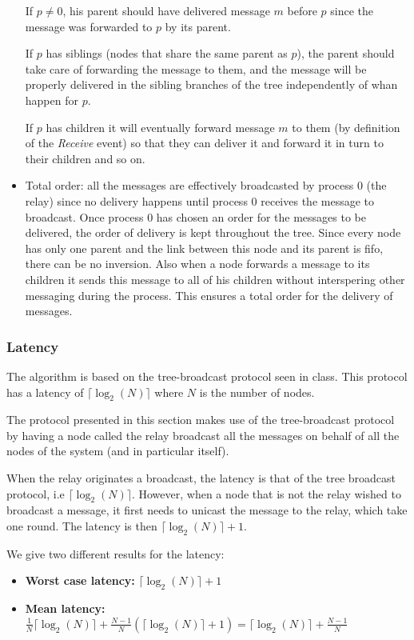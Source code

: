 \documentclass[a4paper]{article}
\begin{document}
\begin{itemize}
        If $p \neq 0$, his parent should have delivered message $m$ before
        $p$ since the message was forwarded to $p$ by its parent.

        If $p$ has siblings (nodes that share the same parent as $p$), the
        parent should take care of forwarding the message to them, and the
        message will be properly delivered in the sibling branches of the
        tree independently of whan happen for $p$.

        If $p$ has children it will eventually forward message $m$ to them
        (by definition of the \textit{Receive} event) so that they can
        deliver it and forward it in turn to their children and so on.
    \item Total order: all the messages are effectively broadcasted by process
        $0$ (the relay) since no delivery happens until process $0$ receives
        the message to broadcast. Once process $0$ has chosen an order for the
        messages to be delivered, the order of delivery is kept throughout the
        tree. Since every node has only one parent and the link between this
        node and its parent is fifo, there can be no inversion. Also when a
        node forwards a message to its children it sends this message to all
        of his children without interspering other messaging during the
        process. This ensures a total order for the delivery of messages.
\end{itemize}

\subsubsection*{Latency}
The algorithm is based on the tree-broadcast protocol seen in class. This
protocol has a latency of $\lceil\log_2(N)\rceil$ where $N$ is the number of
nodes.

The protocol presented in this section makes use of the tree-broadcast
protocol by having a node called the relay broadcast all the messages on
behalf of all the nodes of the system (and in particular itself).

When the relay originates a broadcast, the latency is that of the tree
broadcast protocol, i.e $\lceil\log_2(N)\rceil$. However, when a node that is
not the relay wished to broadcast a message, it first needs to unicast the
message to the relay, which take one round. The latency is then
$\lceil\log_2(N)\rceil + 1$.

We give two different results for the latency:
\begin{itemize}
    \item \textbf{Worst case latency:} $\lceil\log_2(N)\rceil + 1$
    \item \textbf{Mean latency:} $\frac{1}{N} \lceil\log_2(N)\rceil +
        \frac{N-1}{N} (\lceil\log_2(N)\rceil + 1)
        = \lceil\log_2(N)\rceil + \frac{N-1}{N}$
\end{itemize}
\end{document}
